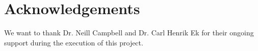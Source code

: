 \documentclass[../dissertation.tex]{subfiles}
\begin{document}
\chapter*{Acknowledgements}

\begin{comment}
{\bf An optional section, of at most $1$ page}
\vspace{1cm} 

\noindent
It is common practice (although totally optional) to acknowledge any
third-party advice, contribution or influence you have found useful
during your work.  Examples include support from friends or family, 
the input of your Supervisor and/or Advisor, external organisations 
or persons who  have supplied resources of some kind (e.g., funding, 
advice or time), and so on.
\end{comment}

We want to thank Dr. Neill Campbell and Dr. Carl Henrik Ek for their ongoing support during the execution of this project.
\end{document}
